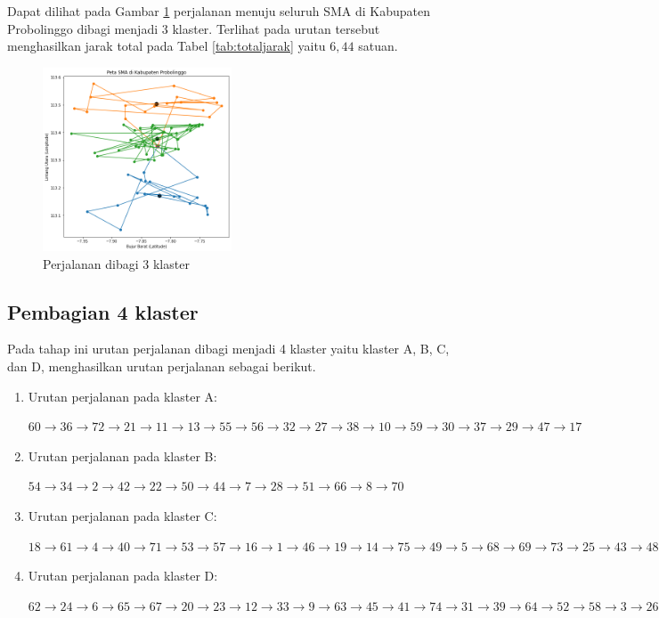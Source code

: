 Dapat dilihat pada Gambar \ref{fig:hasil_mtsp3} perjalanan menuju seluruh SMA di Kabupaten Probolinggo dibagi menjadi 3 klaster. Terlihat pada urutan tersebut menghasilkan jarak total pada Tabel \ref{tab:totaljarak} yaitu $6,44$ satuan.

\begin{figure}[H]
\centering
\includegraphics[width=0.5\textwidth]{Gambar/hasil_mtsp/3}
\caption{Perjalanan dibagi 3 klaster}
\label{fig:hasil_mtsp3}
\end{figure}

\subsection{Pembagian 4 klaster}

Pada tahap ini urutan perjalanan dibagi menjadi 4 klaster yaitu klaster A, B, C, dan D, menghasilkan urutan perjalanan sebagai berikut.

\begin{enumerate}

\item Urutan perjalanan pada klaster A:

$60\rightarrow36\rightarrow72\rightarrow21\rightarrow11\rightarrow13\rightarrow55\rightarrow56\rightarrow32\rightarrow27\rightarrow38\rightarrow10\rightarrow59\rightarrow30\rightarrow37\rightarrow29\rightarrow47\rightarrow17$

\item Urutan perjalanan pada klaster B:

$54\rightarrow34\rightarrow2\rightarrow42\rightarrow22\rightarrow50\rightarrow44\rightarrow7\rightarrow28\rightarrow51\rightarrow66\rightarrow8\rightarrow70$

\item Urutan perjalanan pada klaster C:

$18\rightarrow61\rightarrow4\rightarrow40\rightarrow71\rightarrow53\rightarrow57\rightarrow16\rightarrow1\rightarrow46\rightarrow19\rightarrow14\rightarrow75\rightarrow49\rightarrow5\rightarrow68\rightarrow69\rightarrow73\rightarrow25\rightarrow43\rightarrow48\rightarrow35\rightarrow15$

\item Urutan perjalanan pada klaster D:

$62\rightarrow24\rightarrow6\rightarrow65\rightarrow67\rightarrow20\rightarrow23\rightarrow12\rightarrow33\rightarrow9\rightarrow63\rightarrow45\rightarrow41\rightarrow74\rightarrow31\rightarrow39\rightarrow64\rightarrow52\rightarrow58\rightarrow3\rightarrow26$

\end{enumerate}

